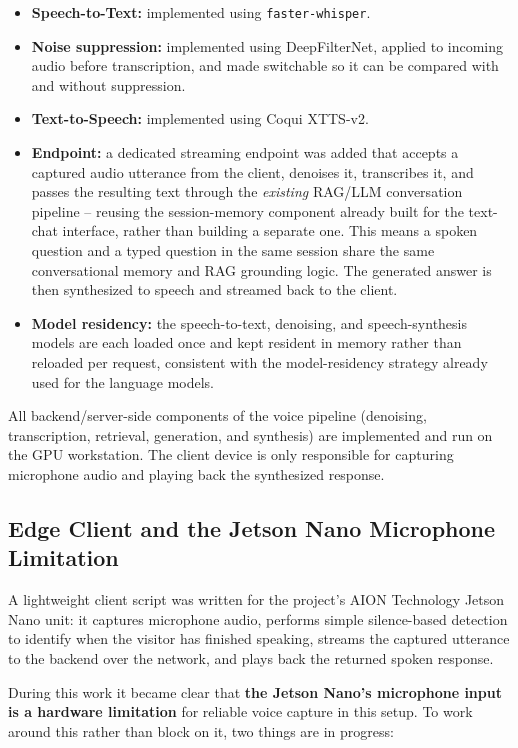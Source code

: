 \documentclass[11pt,a4paper]{article}
\begin{document}
\begin{itemize}
    \item \textbf{Speech-to-Text:} implemented using \texttt{faster-whisper}.
    \item \textbf{Noise suppression:} implemented using DeepFilterNet, applied to incoming audio before transcription, and made switchable so it can be compared with and without suppression.
    \item \textbf{Text-to-Speech:} implemented using Coqui XTTS-v2.
    \item \textbf{Endpoint:} a dedicated streaming endpoint was added that accepts a captured audio utterance from the client, denoises it, transcribes it, and passes the resulting text through the \emph{existing} RAG/LLM conversation pipeline -- reusing the session-memory component already built for the text-chat interface, rather than building a separate one. This means a spoken question and a typed question in the same session share the same conversational memory and RAG grounding logic. The generated answer is then synthesized to speech and streamed back to the client.
    \item \textbf{Model residency:} the speech-to-text, denoising, and speech-synthesis models are each loaded once and kept resident in memory rather than reloaded per request, consistent with the model-residency strategy already used for the language models.
\end{itemize}

All backend/server-side components of the voice pipeline (denoising, transcription, retrieval, generation, and synthesis) are implemented and run on the GPU workstation. The client device is only responsible for capturing microphone audio and playing back the synthesized response.

\subsection{Edge Client and the Jetson Nano Microphone Limitation}

A lightweight client script was written for the project's AION Technology Jetson Nano unit: it captures microphone audio, performs simple silence-based detection to identify when the visitor has finished speaking, streams the captured utterance to the backend over the network, and plays back the returned spoken response.

During this work it became clear that \textbf{the Jetson Nano's microphone input is a hardware limitation} for reliable voice capture in this setup. To work around this rather than block on it, two things are in progress:
\end{document}
